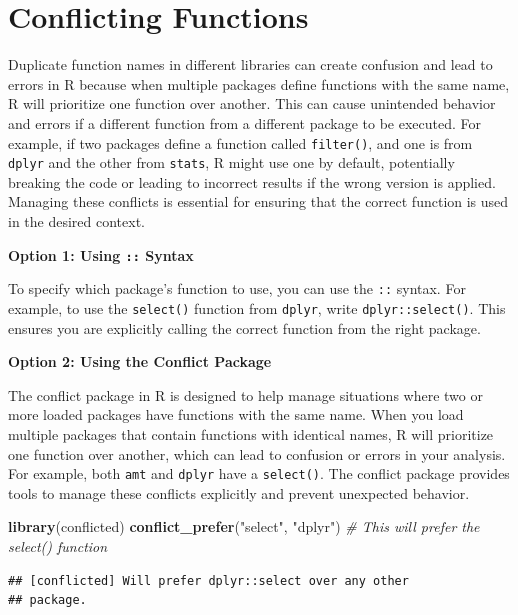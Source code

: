 \documentclass[
]{book}
\newenvironment{Shaded}{\begin{snugshade}}{\end{snugshade}}
\newcommand{\CommentTok}[1]{\textcolor[rgb]{0.56,0.35,0.01}{\textit{#1}}}
\newcommand{\FunctionTok}[1]{\textcolor[rgb]{0.13,0.29,0.53}{\textbf{#1}}}
\newcommand{\NormalTok}[1]{#1}
\newcommand{\StringTok}[1]{\textcolor[rgb]{0.31,0.60,0.02}{#1}}
\begin{document}
\section{Conflicting Functions}\label{conflicting-functions}

Duplicate function names in different libraries can create confusion and lead to errors in R because when multiple packages define functions with the same name, R will prioritize one function over another. This can cause unintended behavior and errors if a different function from a different package to be executed. For example, if two packages define a function called \texttt{filter()}, and one is from \texttt{dplyr} and the other from \texttt{stats}, R might use one by default, potentially breaking the code or leading to incorrect results if the wrong version is applied. Managing these conflicts is essential for ensuring that the correct function is used in the desired context.

\textbf{Option 1: Using \texttt{::} Syntax}

To specify which package's function to use, you can use the \texttt{::} syntax. For example, to use the \texttt{select()} function from \texttt{dplyr}, write \texttt{dplyr::select()}. This ensures you are explicitly calling the correct function from the right package.

\textbf{Option 2: Using the Conflict Package}

The conflict package in R is designed to help manage situations where two or more loaded packages have functions with the same name. When you load multiple packages that contain functions with identical names, R will prioritize one function over another, which can lead to confusion or errors in your analysis. For example, both \texttt{amt} and \texttt{dplyr} have a \texttt{select()}. The conflict package provides tools to manage these conflicts explicitly and prevent unexpected behavior.

\begin{Shaded}
\begin{Highlighting}[]
\FunctionTok{library}\NormalTok{(conflicted)}
\FunctionTok{conflict\_prefer}\NormalTok{(}\StringTok{"select"}\NormalTok{, }\StringTok{"dplyr"}\NormalTok{)  }\CommentTok{\# This will prefer the select() function }
\end{Highlighting}
\end{Shaded}

\begin{verbatim}
## [conflicted] Will prefer dplyr::select over any other
## package.
\end{verbatim}
\end{document}

